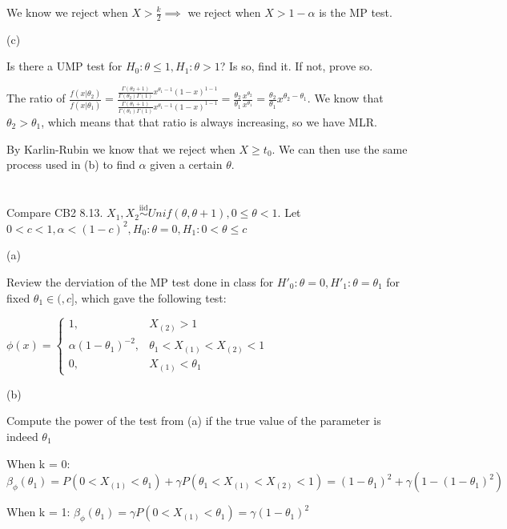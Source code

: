 \documentclass{article}
\newcommand{\iiddist}{\overset{\mathrm{iid}}{\sim}}
\begin{document}
We know we reject when $X > \frac{k}{2} \implies$ we reject when $X > 1 - \alpha$ is the MP test.

(c)

Is there a UMP test for $H_0: \theta \le 1, H_1: \theta > 1$? Is so, find it. If not, prove so. 

The ratio of $\frac{f(x|\theta_2)}{f(x|\theta_1)} = \frac{\frac{\Gamma(\theta_2 + 1)}{\Gamma(\theta_2)\Gamma(1)}x^{\theta_1 - 1}(1-x)^{1-1}}{\frac{\Gamma(\theta_1 + 1)}{\Gamma(\theta_1)\Gamma(1)}x^{\theta_1 - 1}(1-x)^{1-1}} = \frac{\theta_2}{\theta_1}\frac{x^{\theta_2}}{x^{\theta_1}} = \frac{\theta_2}{\theta_1}x^{\theta_2 - \theta_1}$. We know that $\theta_2 > \theta_1$, which means that that ratio is always increasing, so we have MLR.  

By Karlin-Rubin we know that we reject when $X \ge t_0$. We can then use the same process used in (b) to find $\alpha$ given a certain $\theta$. 


\section{}

Compare CB2 8.13. $X_1, X_2 \iiddist Unif(\theta, \theta+1), 0 \le \theta < 1$. Let $0 < c < 1, \alpha < (1-c)^2, H_0: \theta = 0, H_1: 0 < \theta \le c$

(a)

Review the derviation of the MP test done in class for $H'_0: \theta = 0, H'_1: \theta = \theta_1$ for fixed $\theta_1 \in (,c]$, which gave the following test:

$\phi(x) = \begin{cases} 1, & X_{(2)} > 1 \\ \alpha(1-\theta_1)^{-2}, & \theta_1 < X_{(1)} < X_{(2)} < 1 \\ 0, & X_{(1)} < \theta_1 \end{cases}$

(b)

Compute the power of the test from (a) if the true value of the parameter is indeed $\theta_1$

When k = 0: $\beta_{\phi}(\theta_1) = P(0 < X_{(1)} < \theta_1) + \gamma P(\theta_1 < X_{(1)} < X_{(2)} < 1) = (1-\theta_1)^2 + \gamma(1 - (1-\theta_1)^2)$

When k = 1: $\beta_{\phi}(\theta_1) = \gamma P(0 < X_{(1)} < \theta_1) = \gamma(1-\theta_1)^2$
\end{document}
